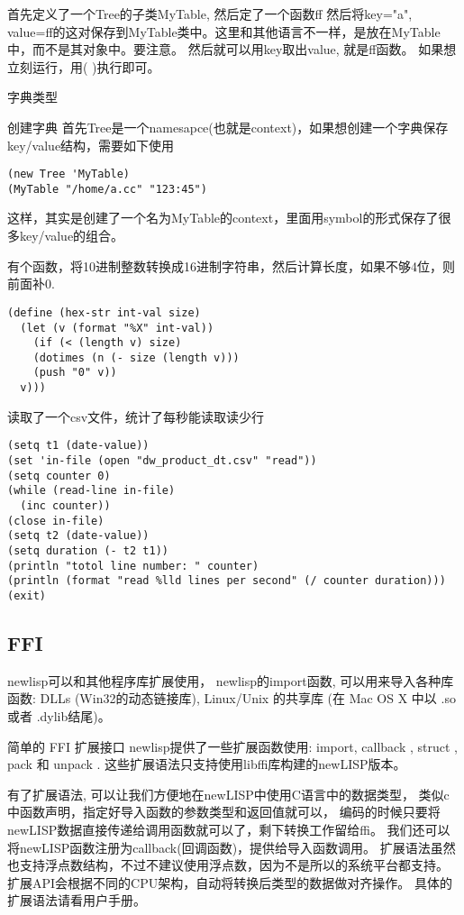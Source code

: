 \documentclass[cn,11pt]{elegantbook}
\begin{document}
 
首先定义了一个Tree的子类MyTable,
然后定了一个函数ff
然后将key="a", value=ff的这对保存到MyTable类中。这里和其他语言不一样，是放在MyTable中，而不是其对象中。要注意。
然后就可以用key取出value, 就是ff函数。
如果想立刻运行，用( )执行即可。

字典类型

创建字典
首先Tree是一个namesapce(也就是context)，如果想创建一个字典保存key/value结构，需要如下使用
\begin{lstlisting}
(new Tree 'MyTable) 
(MyTable "/home/a.cc" "123:45")
\end{lstlisting}
这样，其实是创建了一个名为MyTable的context，里面用symbol的形式保存了很多key/value的组合。


有个函数，将10进制整数转换成16进制字符串，然后计算长度，如果不够4位，则前面补0.

\begin{lstlisting}
(define (hex-str int-val size)
  (let (v (format "%X" int-val))
    (if (< (length v) size)
    (dotimes (n (- size (length v)))
    (push "0" v))
  v)))
\end{lstlisting}


读取了一个csv文件，统计了每秒能读取读少行
\begin{lstlisting}
(setq t1 (date-value))
(set 'in-file (open "dw_product_dt.csv" "read"))
(setq counter 0)
(while (read-line in-file)
  (inc counter))
(close in-file)
(setq t2 (date-value))
(setq duration (- t2 t1))
(println "totol line number: " counter)
(println (format "read %lld lines per second" (/ counter duration)))
(exit)
 \end{lstlisting}

 \subsection{FFI}
 newlisp可以和其他程序库扩展使用，
 newlisp的import函数, 可以用来导入各种库函数: DLLs (Win32的动态链接库), Linux/Unix 的共享库 (在 Mac OS X 中以 .so 或者 .dylib结尾)。
 

简单的 FFI 扩展接口
newlisp提供了一些扩展函数使用: import, callback , struct , pack 和 unpack . 这些扩展语法只支持使用libffi库构建的newLISP版本。

有了扩展语法, 可以让我们方便地在newLISP中使用C语言中的数据类型，
类似c中函数声明，指定好导入函数的参数类型和返回值就可以，
编码的时候只要将newLISP数据直接传递给调用函数就可以了，剩下转换工作留给ffi。 我们还可以将newLISP函数注册为callback(回调函数)，提供给导入函数调用。
扩展语法虽然也支持浮点数结构，不过不建议使用浮点数，因为不是所以的系统平台都支持。
扩展API会根据不同的CPU架构，自动将转换后类型的数据做对齐操作。 具体的扩展语法请看用户手册。
\end{document}
